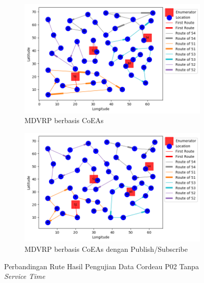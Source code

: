 \begin{figure}[!]
	\centering
	\begin{subfigure}[t]{\textwidth}
		\centering
		\includegraphics[width=\textwidth]{Resources/Images/test_result_cordeau_p02_notw_coes}
		\caption{MDVRP berbasis CoEAs}
		\label{fig:test_result_cordeau_p02_notw_coes}
	\end{subfigure}%
	
	\begin{subfigure}[t]{\textwidth}
		\centering
		\includegraphics[width=\textwidth]{Resources/Images/test_result_cordeau_p02_notw_pubsub_coes}
		\caption{MDVRP berbasis CoEAs dengan Publish/Subscribe}
		\label{fig:test_result_cordeau_p02_notw_pubsub_coes}
	\end{subfigure}
	\caption{Perbandingan Rute Hasil Pengujian Data Cordeau P02 Tanpa \textit{Service Time}}
	\label{fig:test_result_cordeau_p02_notw}
\end{figure}


